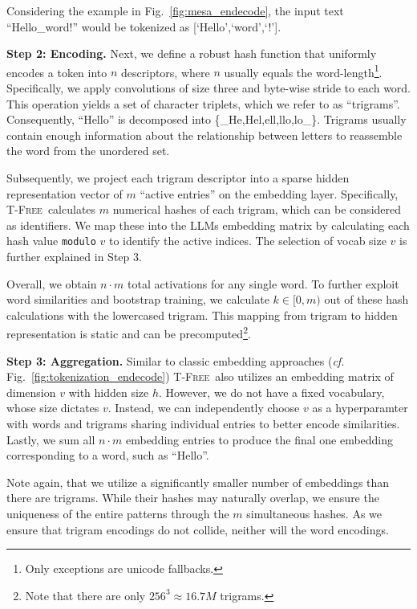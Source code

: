 \documentclass[11pt]{article}
\newcommand{\method}{\textsc{T-Free}}
\begin{document}
Considering the example in  Fig.~\ref{fig:mesa_endecode}, the input text ``Hello\_word!'' would be tokenized as [`Hello',`word',`!'].

\textbf{Step 2: Encoding.} Next, we define a robust hash function that uniformly encodes a token into $n$ descriptors, where $n$ usually equals the word-length\footnote{Only exceptions are unicode fallbacks.}.
Specifically, we apply convolutions of size three and byte-wise stride to each word. This operation yields a set of character triplets, which we refer to as ``trigrams''. 
Consequently, ``Hello'' is decomposed into \{\_He,Hel,ell,llo,lo\_\}.
Trigrams usually contain enough information about the relationship between letters to reassemble the word from the unordered set. 

Subsequently, we project each trigram descriptor into a sparse hidden representation vector of $m$ ``active entries'' on the embedding layer. 
Specifically, \method~calculates $m$ numerical hashes of each trigram, which can be considered as identifiers.
We map these into the LLMs embedding matrix by calculating each hash value \texttt{modulo} $v$ to identify the active indices. The selection of vocab size $v$ is further explained in Step 3.

Overall, we obtain $n\cdot m$ total activations for any single word.
To further exploit word similarities and bootstrap training, we calculate $k\in [0,m)$ out of these hash calculations with the lowercased trigram.
This mapping from trigram to hidden representation is static and can be precomputed\footnote{Note that there are only $256^3\approx 16.7M$ trigrams.}.

\textbf{Step 3: Aggregation.}
Similar to classic embedding approaches (\emph{cf.} Fig.~\ref{fig:tokenization_endecode}) \method~also utilizes an embedding matrix of dimension $v$ with hidden size $h$. However, we do not have a fixed vocabulary, whose size dictates $v$. Instead, we can independently choose $v$ as a hyperparamter with words and trigrams sharing individual entries to better encode similarities. 
Lastly, we sum all $n\cdot m$ embedding entries to produce the final one embedding corresponding to a word, such as ``Hello''.

Note again, that we utilize a significantly smaller number of embeddings than there are trigrams. While their hashes may naturally overlap, we ensure the uniqueness of the  entire patterns through the $m$ simultaneous hashes. As we ensure that trigram encodings do not collide, neither will the word encodings.
\end{document}
